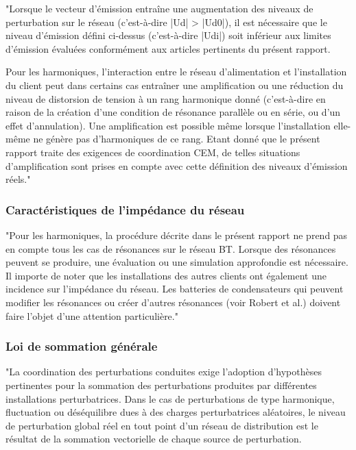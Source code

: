 "Lorsque le vecteur d'émission entraîne une augmentation des niveaux de perturbation sur le réseau (c'est-à-dire |Ud| > |Ud0|), il est nécessaire que le niveau d'émission défini ci-dessus (c'est-à-dire |Udi|) soit inférieur aux limites d'émission évaluées conformément aux articles pertinents du présent rapport.

Pour les harmoniques, l'interaction entre le réseau d'alimentation et l'installation du client peut dans certains cas entraîner une amplification ou une réduction du niveau de distorsion de tension à un rang harmonique donné (c'est-à-dire en raison de la création d'une condition de résonance parallèle ou en série, ou d'un effet d'annulation). Une amplification est possible même lorsque l'installation elle-même ne génère pas d'harmoniques de ce rang. Etant donné que le présent rapport traite des exigences de coordination CEM, de telles situations d'amplification sont prises en compte avec cette définition des niveaux d'émission réels."


\subsubsection{Caractéristiques de l'impédance du réseau}

"Pour les harmoniques, la procédure décrite dans le présent rapport ne prend pas en compte tous les cas de résonances sur le réseau BT. Lorsque des résonances peuvent se produire, une évaluation ou une simulation approfondie est nécessaire. Il importe de noter que les installations des autres clients ont également une incidence sur l'impédance du réseau. Les batteries de condensateurs qui peuvent modifier les résonances ou créer d'autres résonances (voir Robert et al.) doivent faire l'objet d'une attention particulière."


\subsubsection{Loi de sommation générale}

"La coordination des perturbations conduites exige l'adoption d'hypothèses pertinentes pour la sommation des perturbations produites par différentes installations perturbatrices. Dans le cas de perturbations de type harmonique, fluctuation ou déséquilibre dues à des charges perturbatrices aléatoires, le niveau de perturbation global réel en tout point d'un réseau de distribution est le résultat de la sommation vectorielle de chaque source de perturbation.


